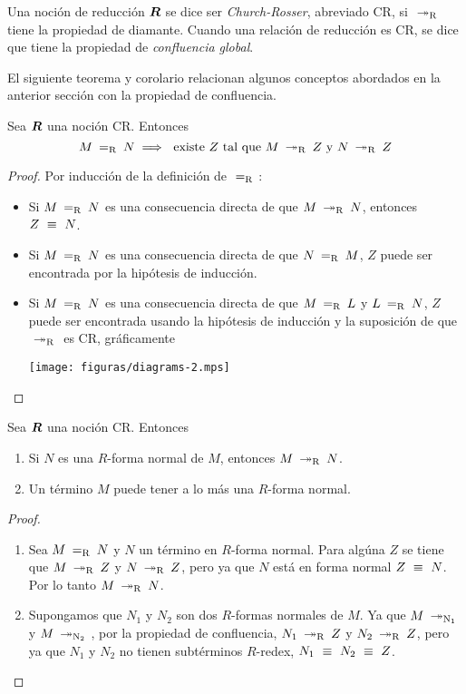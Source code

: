 \begin{defn}
  Una noción de reducción $ \boldsymbol{R} $ se dice ser \emph{Church-Rosser}, abreviado CR, si $ \ \operatorname{\twoheadrightarrow_{R}}\  $ tiene la propiedad de diamante. Cuando una relación de reducción es CR, se dice que tiene la propiedad de \emph{confluencia global}.
\end{defn}

El siguiente teorema y corolario relacionan algunos conceptos abordados en la anterior sección con la propiedad de confluencia.

\begin{thm}
  Sea $ \boldsymbol{R} $ una noción CR. Entonces
  \[ M \ \operatorname{=_{R}}\  N \implies \text{ existe } Z \text{ tal que } M \ \operatorname{\twoheadrightarrow_{R}}\  Z \text{ y } N \ \operatorname{\twoheadrightarrow_{R}}\  Z \]
  \begin{proof}
    Por inducción de la definición de $ \ \operatorname{=_{R}}\  $:
    \begin{itemize}
    \item Si $ M \ \operatorname{=_{R}}\  N $ es una consecuencia directa de que $ M \ \operatorname{\twoheadrightarrow_{R}}\  N $, entonces $ Z \ \equiv\  N $.
    \item Si $ M \ \operatorname{=_{R}}\  N $ es una consecuencia directa de que $ N \ \operatorname{=_{R}}\  M $, $ Z $ puede ser encontrada por la hipótesis de inducción.
    \item Si $ M \ \operatorname{=_{R}}\  N $ es una consecuencia directa de que $ M \ \operatorname{=_{R}}\  L $ y $ L \ \operatorname{=_{R}}\  N $, $ Z $ puede ser encontrada usando la hipótesis de inducción y la suposición de que $ \ \operatorname{\twoheadrightarrow_{R}}\  $ es CR, gráficamente
      \begin{center}
        \texttt{[image: figuras/diagrams-2.mps]}
      \end{center}
    \end{itemize}
  \end{proof}
\end{thm}

\begin{cor}
  Sea $ \boldsymbol{R} $ una noción CR. Entonces
  \begin{enumerate}
  \item Si $ N $ es una $ R $-forma normal de $ M $, entonces $ M \ \operatorname{\twoheadrightarrow_{R}}\  N $.
  \item Un término $ M $ puede tener a lo más una $ R $-forma normal.
  \end{enumerate}
  \begin{proof}
    \begin{enumerate}
    \item Sea $ M \ \operatorname{=_{R}}\  N $ y $ N $ un término en $ R $-forma normal. Para algúna $ Z $ se tiene que $ M \ \operatorname{\twoheadrightarrow_{R}}\  Z $ y $ N \ \operatorname{\twoheadrightarrow_{R}}\  Z $, pero ya que $ N $ está en forma normal $ Z \ \equiv\  N $. Por lo tanto $ M \ \operatorname{\twoheadrightarrow_{R}}\  N $.
    \item Supongamos que $ N_{1} $ y $ N_{2} $ son dos $ R $-formas normales de $ M $. Ya que $ M \ \operatorname{\twoheadrightarrow_{N_{1}}}\  $ y $ M \ \operatorname{\twoheadrightarrow_{N_{2}}}\  $, por la propiedad de confluencia, $ N_{1} \ \operatorname{\twoheadrightarrow_{R}}\  Z $ y $ N_{2} \ \operatorname{\twoheadrightarrow_{R}}\  Z $, pero ya que $ N_{1} $ y $ N_{2} $ no tienen subtérminos $ R $-redex, $ N_{1} \ \equiv\  N_{2} \ \equiv\  Z $.
    \end{enumerate}
  \end{proof}
\end{cor}

